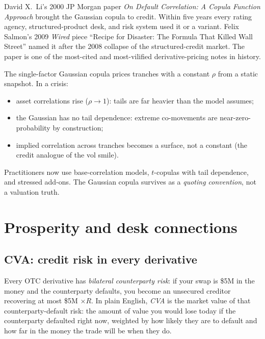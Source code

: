 \begin{historybox}[title={The formula that killed Wall Street}]
David X.\ Li's 2000 JP Morgan paper \emph{On Default Correlation:
A Copula Function Approach} brought the Gaussian copula to credit.
Within five years every rating agency, structured-product desk, and
risk system used it or a variant.  Felix Salmon's 2009 \emph{Wired}
piece ``Recipe for Disaster: The Formula That Killed Wall Street''
\citep{salmon2009formula} named it after the 2008 collapse of the
structured-credit market.  The paper is one of the most-cited and
most-vilified derivative-pricing notes in history.
\end{historybox}

\begin{pitfallbox}
The single-factor Gaussian copula prices tranches with a constant
$\rho$ from a static snapshot.  In a crisis:
\begin{itemize}
  \item asset correlations rise ($\rho \to 1$): tails are far
    heavier than the model assumes;
  \item the Gaussian has no tail dependence: extreme co-movements
    are near-zero-probability by construction;
  \item implied correlation across tranches becomes a surface, not
    a constant (the credit analogue of the vol smile).
\end{itemize}
Practitioners now use base-correlation models, $t$-copulas with
tail dependence, and stressed add-ons.  The Gaussian copula
survives as a \emph{quoting convention}, not a valuation truth.
\end{pitfallbox}


\section{Prosperity and desk connections}
\label{sec:credit_practical}

\subsection{CVA: credit risk in every derivative}
\label{sec:cva_preview}

Every OTC derivative has \emph{bilateral counterparty risk}: if
your swap is \$5M in the money and the counterparty defaults, you
become an unsecured creditor recovering at most \$5M $\times R$.
In plain English, \emph{CVA} is the market value of that
counterparty-default risk: the amount of value you would lose
today if the counterparty defaulted right now, weighted by how
likely they are to default and how far in the money the trade will
be when they do.

